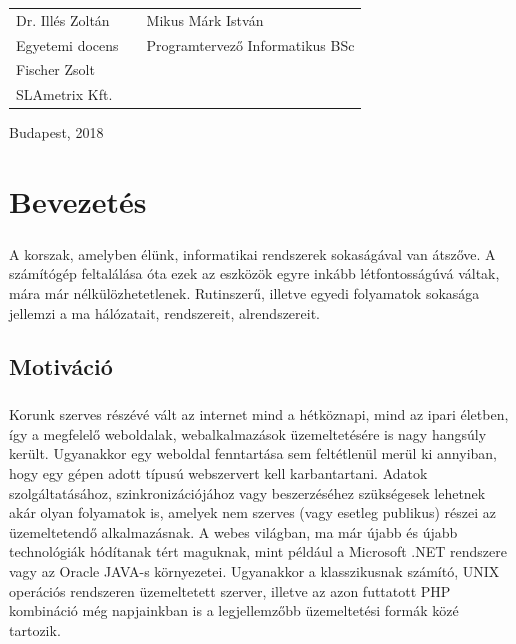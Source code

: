 \documentclass[12pt]{report}
\begin{document}
\begin{titlepage}
      \vspace*{5cm}

      \begin{tabular}{lp{6cm}l}
          Dr. Illés Zoltán  & &  Mikus Márk István \\
          Egyetemi docens & & Programtervező Informatikus BSc \\
          Fischer Zsolt & \\
          SLAmetrix Kft. &
      \end{tabular}		

      \vfill

      \vspace*{1cm}
      Budapest, 2018
  \end{titlepage}
	\tableofcontents

\chapter{Bevezetés}
\paragraph{}
A korszak, amelyben élünk, informatikai rendszerek sokaságával van átszőve. A számítógép feltalálása óta ezek az eszközök egyre inkább létfontosságúvá váltak, mára már nélkülözhetetlenek. Rutinszerű, illetve egyedi folyamatok sokasága jellemzi a ma hálózatait, rendszereit, alrendszereit.

\section{Motiváció}
\paragraph{}
Korunk szerves részévé vált az internet mind a hétköznapi, mind az ipari életben, így a megfelelő weboldalak, webalkalmazások üzemeltetésére is nagy hangsúly került. Ugyanakkor egy weboldal fenntartása sem feltétlenül merül ki annyiban, hogy egy gépen adott típusú webszervert kell karbantartani. Adatok szolgáltatásához, szinkronizációjához vagy beszerzéséhez szükségesek lehetnek akár olyan folyamatok is, amelyek nem szerves (vagy esetleg publikus) részei az üzemeltetendő alkalmazásnak.
A webes világban, ma már újabb és újabb technológiák hódítanak tért maguknak, mint például a Microsoft .NET rendszere vagy az Oracle JAVA-s környezetei. Ugyanakkor a klasszikusnak számító,  UNIX operációs rendszeren üzemeltetett szerver, illetve az azon futtatott PHP kombináció még napjainkban is a legjellemzőbb üzemeltetési formák közé tartozik.
\end{document}
